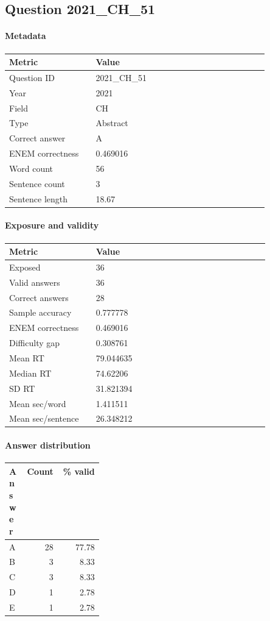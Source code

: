 \subsection*{Question 2021\_CH\_51}
\label{sec:q_2021_CH_51}
\paragraph{Metadata}
\begin{tabular}{p{0.30\linewidth}p{0.60\linewidth}}
\toprule
Metric & Value\\
\midrule
Question ID & 2021\_CH\_51\\
Year & 2021\\
Field & CH\\
Type & Abstract\\
Correct answer & A\\
ENEM correctness & 0.469016\\
Word count & 56\\
Sentence count & 3\\
Sentence length & 18.67\\
\bottomrule
\end{tabular}

\paragraph{Exposure and validity}
\begin{tabular}{p{0.30\linewidth}p{0.60\linewidth}}
\toprule
Metric & Value\\
\midrule
Exposed & 36\\
Valid answers & 36\\
Correct answers & 28\\
Sample accuracy & 0.777778\\
ENEM correctness & 0.469016\\
Difficulty gap & 0.308761\\
Mean RT & 79.044635\\
Median RT & 74.62206\\
SD RT & 31.821394\\
Mean sec/word & 1.411511\\
Mean sec/sentence & 26.348212\\
\bottomrule
\end{tabular}

\paragraph{Answer distribution}
\begin{tabular}{p{0.18\linewidth}rr}
\toprule
Answer & Count & \% valid\\
\midrule
A & 28 & 77.78\\
B & 3 & 8.33\\
C & 3 & 8.33\\
D & 1 & 2.78\\
E & 1 & 2.78\\
\bottomrule
\end{tabular}

